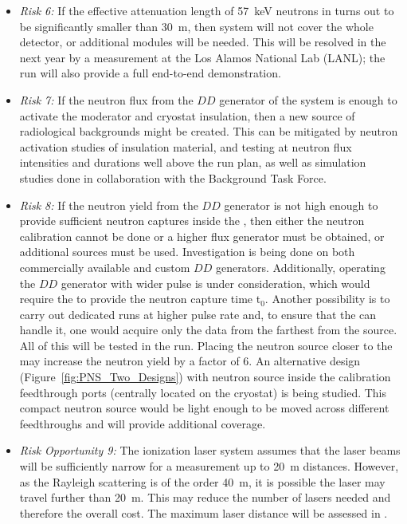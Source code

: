 \begin{itemize}
    \item \textit{Risk 6:} If the effective attenuation length of \SI{57}{keV} neutrons in  turns out to be significantly smaller than \SI{30}{m}, then  system will not cover the whole detector, or additional modules will be needed. This will be resolved in the next year by a measurement at the Los Alamos National Lab (LANL); the  run will also provide a full end-to-end demonstration.
    \item \textit{Risk 7:} If the neutron flux from the $DD$ generator of the  system is enough to activate the moderator and cryostat insulation, then a new source of radiological backgrounds might be created. This can be mitigated by neutron activation studies of insulation material, and  testing at neutron flux intensities and durations well above the run plan, as well as simulation studies done in collaboration with the  Background Task Force.
    \item \textit{Risk 8:} If the neutron yield from the $DD$ generator is not high enough to provide sufficient neutron captures inside the , then either the neutron calibration cannot be done or a higher flux generator must be obtained, or additional sources must be used. Investigation is being done on both commercially available and  custom $DD$ generators. Additionally, operating the $DD$ generator with wider  pulse is under consideration, which would require the  to provide the neutron capture time t$_{0}$. Another possibility is to carry out dedicated runs at higher pulse rate and, to ensure that the  can handle it, one would acquire only the data from the  farthest from the source. All of this will be tested in the  run. Placing the neutron source closer to the  may increase the neutron yield by a factor of 6. An alternative design (Figure~\ref{fig:PNS_Two_Designs}) with neutron source inside the calibration feedthrough ports (centrally located on the cryostat) is being studied. This compact neutron source would be light enough to be moved across different feedthroughs and will provide additional coverage.
    \item \textit{Risk Opportunity 9:} The ionization laser system assumes that the laser beams will be sufficiently narrow for a measurement up to \SI{20}{m} distances. However, as the Rayleigh scattering is of the order \SI{40}{m}, it is possible the laser may travel further than \SI{20}{m}. This may reduce the number of lasers needed and therefore the overall cost. The maximum laser distance will be assessed in .
\end{itemize}

